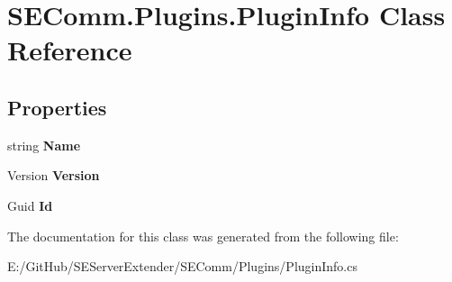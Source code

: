 \hypertarget{class_s_e_comm_1_1_plugins_1_1_plugin_info}{}\section{S\+E\+Comm.\+Plugins.\+Plugin\+Info Class Reference}
\label{class_s_e_comm_1_1_plugins_1_1_plugin_info}
\subsection*{Properties}
\begin{DoxyCompactItemize}
\item 
\hypertarget{class_s_e_comm_1_1_plugins_1_1_plugin_info_a536f99983a62a58bd7417fdd90d648e3}{}string {\bfseries Name}\label{class_s_e_comm_1_1_plugins_1_1_plugin_info_a536f99983a62a58bd7417fdd90d648e3}

\item 
\hypertarget{class_s_e_comm_1_1_plugins_1_1_plugin_info_af40bf0845f10b12cd1ada59c7a4ac52f}{}Version {\bfseries Version}\label{class_s_e_comm_1_1_plugins_1_1_plugin_info_af40bf0845f10b12cd1ada59c7a4ac52f}

\item 
\hypertarget{class_s_e_comm_1_1_plugins_1_1_plugin_info_ad618561e98b2be37c622eb052f2008e8}{}Guid {\bfseries Id}\label{class_s_e_comm_1_1_plugins_1_1_plugin_info_ad618561e98b2be37c622eb052f2008e8}

\end{DoxyCompactItemize}


The documentation for this class was generated from the following file\+:\begin{DoxyCompactItemize}
\item 
E\+:/\+Git\+Hub/\+S\+E\+Server\+Extender/\+S\+E\+Comm/\+Plugins/Plugin\+Info.\+cs\end{DoxyCompactItemize}
